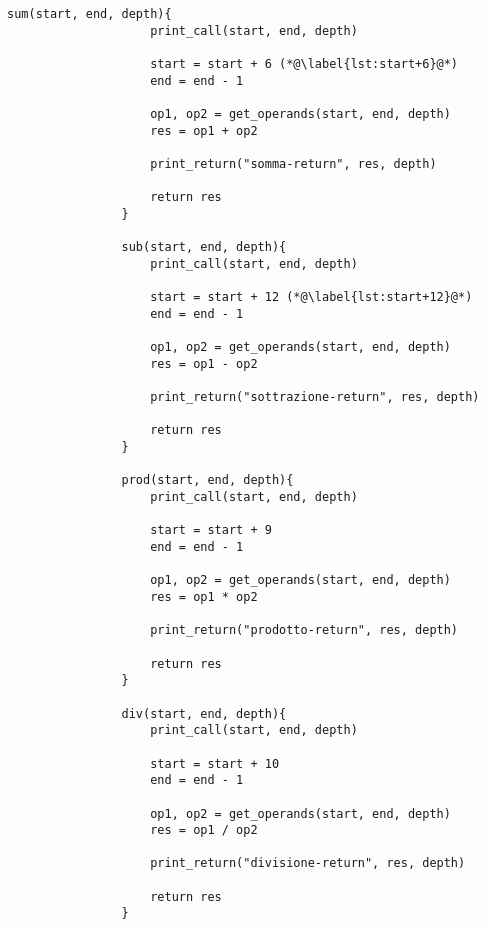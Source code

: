        \begin{center}
           	\begin{lstlisting}[language=pseudo, gobble=14]
                sum(start, end, depth){
                   	print_call(start, end, depth)
                   	
                   	start = start + 6 (*@\label{lst:start+6}@*)
                   	end = end - 1
                   	
                   	op1, op2 = get_operands(start, end, depth)
                   	res = op1 + op2
                   	
                   	print_return("somma-return", res, depth)
                   	
                   	return res
                }
                
                sub(start, end, depth){
                   	print_call(start, end, depth)
                   	
                   	start = start + 12 (*@\label{lst:start+12}@*)
                   	end = end - 1
                   	
                   	op1, op2 = get_operands(start, end, depth)
                   	res = op1 - op2
                   	
                   	print_return("sottrazione-return", res, depth)
                   	
                   	return res
                }
                
                prod(start, end, depth){
                   	print_call(start, end, depth)
                   	
                   	start = start + 9
                   	end = end - 1
                   	
                   	op1, op2 = get_operands(start, end, depth)
                   	res = op1 * op2
                   	
                   	print_return("prodotto-return", res, depth)
                   	
                   	return res
                }
                
                div(start, end, depth){
                   	print_call(start, end, depth)
                   	
                   	start = start + 10
                   	end = end - 1
                   	
                   	op1, op2 = get_operands(start, end, depth)
                   	res = op1 / op2
                   	
                   	print_return("divisione-return", res, depth)
                   	
                   	return res
                }\end{lstlisting}
        \end{center}
        
